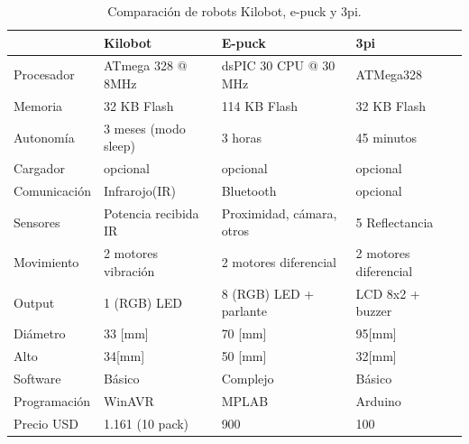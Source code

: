 \begin{table}\small
    \begin{tabular}{l|lll}
    ~                        &    Kilobot                    &    E-puck                                           &    3pi                          \\ \hline
       Procesador            &    ATmega   328 @ 8MHz &    dsPIC 30 CPU @ 30 MHz                &    ATMega328                    \\
       Memoria               &    32 KB   Flash              &    114 KB   Flash                                   &    32 KB   Flash                \\
       Autonomía             &    3 meses   (modo sleep)     &    3 horas                                          &    45   minutos                 \\
       Cargador              &    opcional                   &    opcional                                         &    opcional                     \\
       Comunicación          &    Infrarojo(IR)              &    Bluetooth                                        &    opcional                     \\
       Sensores              &    Potencia   recibida IR     &    Proximidad,   cámara, otros &    5   Reflectancia \\
       Movimiento            &    2 motores   vibración      &    2 motores   diferencial                          &    2 motores   diferencial      \\
       Output                &   1 (RGB) LED                 &    8 (RGB)   LED + parlante                         &    LCD 8x2 + buzzer             \\
       Diámetro              &    33 [mm]                    &    70 [mm]                                          &    95[mm]                       \\
       Alto                  &    34[mm]                     &    50 [mm]                                          &    32[mm]                       \\
       Software &    Básico                     &    Complejo                                         &    Básico                       \\
       Programación          &    WinAVR                     &    MPLAB                                            &    Arduino                      \\
       Precio USD            &    1.161 (10 pack)            &    900                                              &    100                          \\
    \end{tabular}
    \label{table:comparacion}
    \caption {Comparación de robots Kilobot, e-puck y 3pi.}
\end{table}


